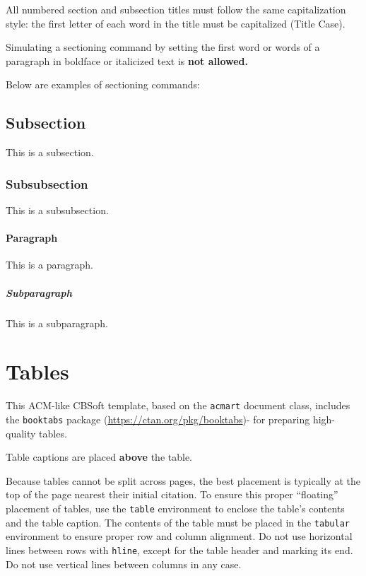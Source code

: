 \documentclass[sigconf]{acmart}
\begin{document}
All numbered section and subsection titles must follow the same capitalization style: the first letter of each word in the title must be capitalized (Title Case).

Simulating a sectioning command by setting the first word or words of a paragraph in boldface or italicized text is {\bfseries not allowed.}

Below are examples of sectioning commands:

\subsection{Subsection}
\label{sec:subsection}

This is a subsection.

\subsubsection{Subsubsection}
\label{sec:subsubsection}

This is a subsubsection.

\paragraph{Paragraph}

This is a paragraph.

\subparagraph{Subparagraph}

This is a subparagraph.

\section{Tables}

This ACM-like CBSoft template, based on the \verb|acmart| document class, includes the \verb|booktabs| package (\url{https://ctan.org/pkg/booktabs})- for preparing high-quality tables.

Table captions are placed \textbf{above} the table.

Because tables cannot be split across pages, the best placement is typically at the top of the page nearest their initial citation. To ensure this proper ``floating'' placement of tables, use the \texttt{table} environment to enclose the table's contents and the table caption. The contents of the table must be placed in the \texttt{tabular} environment to ensure proper row and column alignment. Do not use horizontal lines between rows with \texttt{hline}, except for the table header and marking its end. Do not use vertical lines between columns in any case.
\end{document}
